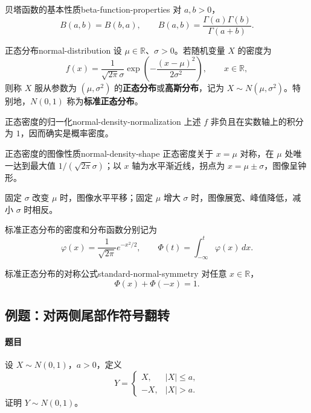 \begin{proposition}{贝塔函数的基本性质}{beta-function-properties}
对 $a,b>0$，
\[
B(a,b)=B(b,a),
\qquad
B(a,b)=\frac{\Gamma(a)\Gamma(b)}{\Gamma(a+b)}.
\]
\end{proposition}

\begin{mydefinition}{正态分布}{normal-distribution}
设 $\mu\in\mathbb R$、$\sigma>0$。若随机变量 $X$ 的密度为
\[
f(x)=\frac1{\sqrt{2\pi}\sigma}
\exp\left(-\frac{(x-\mu)^2}{2\sigma^2}\right),
\qquad x\in\mathbb R,
\]
则称 $X$ 服从参数为 $(\mu,\sigma^2)$ 的\textbf{正态分布}或\textbf{高斯分布}，记为 $X\sim N(\mu,\sigma^2)$。特别地，$N(0,1)$ 称为\textbf{标准正态分布}。
\end{mydefinition}

\begin{proposition}{正态密度的归一化}{normal-density-normalization}
上述 $f$ 非负且在实数轴上的积分为 $1$，因而确实是概率密度。
\end{proposition}

\begin{proposition}{正态密度的图像性质}{normal-density-shape}
正态密度关于 $x=\mu$ 对称，在 $\mu$ 处唯一达到最大值 $1/(\sqrt{2\pi}\sigma)$；以 $x$ 轴为水平渐近线，拐点为 $x=\mu\pm\sigma$，图像呈钟形。

固定 $\sigma$ 改变 $\mu$ 时，图像水平平移；固定 $\mu$ 增大 $\sigma$ 时，图像展宽、峰值降低，减小 $\sigma$ 时相反。
\end{proposition}

标准正态分布的密度和分布函数分别记为
\[
\varphi(x)=\frac1{\sqrt{2\pi}}e^{-x^2/2},
\qquad
\Phi(t)=\int_{-\infty}^t\varphi(x)\,dx.
\]

\begin{proposition}{标准正态分布的对称公式}{standard-normal-symmetry}
对任意 $x\in\mathbb R$，
\[
\Phi(x)+\Phi(-x)=1.
\]
\end{proposition}

\subsection{例题：对两侧尾部作符号翻转}\label{note:c2:e17}
\paragraph{题目}
设 $X\sim N(0,1)$，$a>0$，定义
\[
Y=
\begin{cases}
X,&|X|\leq a,\\
-X,&|X|>a.
\end{cases}
\]
证明 $Y\sim N(0,1)$。

